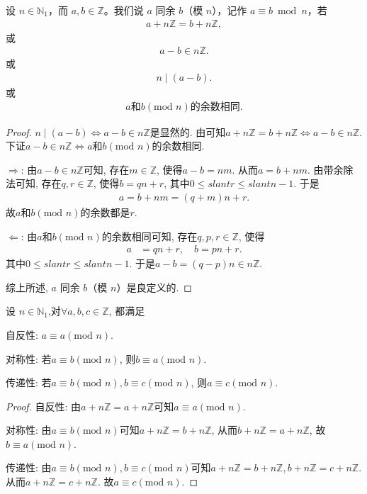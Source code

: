 \documentclass[../../main.tex]{subfiles}
\begin{document}
\begin{definition}[同余(模$n$)]
设 $n\in \mathbb{N}_1$，而 $a,b\in \mathbb{Z}$。我们说 $a$ 同余 $b$（模 $n$），记作 $a\equiv b\bmod n$，若
\begin{align*}
a + n\mathbb{Z}=b + n\mathbb{Z},
\end{align*}
或
\begin{align*}
a - b\in n\mathbb{Z}.
\end{align*}
或
\begin{align*}
n\mid (a-b).
\end{align*}
或
\begin{align*}
    a\text{和}b (\mathrm{mod}\,\,n)\text{的余数相同}.
\end{align*}
\end{definition}
\begin{proof}
$n\mid (a-b)\Leftrightarrow a - b\in n\mathbb{Z}$是显然的.
由可知$a+n\mathbb{Z} =b+n\mathbb{Z} \Leftrightarrow a-b\in n\mathbb{Z} .$下证$a - b \in n\mathbb{Z} \Leftrightarrow a$和$b (\mathrm{mod}\,\,n)$的余数相同.

$\Rightarrow$: 由$a - b \in n\mathbb{Z}$可知, 存在$m \in \mathbb{Z}$, 使得$a - b = nm$. 从而$a = b + nm$. 由带余除法可知, 存在$q, r \in \mathbb{Z}$, 使得$b = qn + r$, 其中$0 \leqslant slant r \leqslant slant n - 1$. 于是
\begin{align*}
a = b + nm 
= (q + m)n + r.
\end{align*}
故$a$和$b (\mathrm{mod}\,\,n)$的余数都是$r$.

$\Leftarrow$: 由$a$和$b (\mathrm{mod}\,\,n)$的余数相同可知, 存在$q, p, r \in \mathbb{Z}$, 使得
\begin{align*}
a &= qn + r, \quad b = pn + r.
\end{align*}
其中$0 \leqslant slant r \leqslant slant n - 1$. 于是$a - b = (q - p)n \in n\mathbb{Z}$.

综上所述, $a$ 同余 $b$（模 $n$）是良定义的.
\end{proof}

\begin{proposition}
设 $n\in \mathbb{N}_1$,对$\forall a, b, c \in \mathbb{Z}$, 都满足

自反性: $a \equiv a (\mathrm{mod}\,\,n)$.

对称性: 若$a \equiv b (\mathrm{mod}\,\,n)$, 则$b \equiv a (\mathrm{mod}\,\,n)$.

传递性: 若$a \equiv b (\mathrm{mod}\,\,n), b \equiv c (\mathrm{mod}\,\,n)$, 则$a \equiv c (\mathrm{mod}\,\,n)$.
\end{proposition}
\begin{proof}
自反性: 由$a + n\mathbb{Z} = a + n\mathbb{Z}$可知$a \equiv a (\mathrm{mod}\,\,n)$.

对称性: 由$a \equiv b (\mathrm{mod}\,\,n)$可知$a + n\mathbb{Z} = b + n\mathbb{Z}$, 从而$b + n\mathbb{Z} = a + n\mathbb{Z}$, 故$b \equiv a (\mathrm{mod}\,\,n)$.

传递性: 由$a \equiv b (\mathrm{mod}\,\,n), b \equiv c (\mathrm{mod}\,\,n)$可知$a + n\mathbb{Z} = b + n\mathbb{Z}, b + n\mathbb{Z} = c + n\mathbb{Z}$. 从而$a + n\mathbb{Z} = c + n\mathbb{Z}$. 故$a \equiv c (\mathrm{mod}\,\,n)$. 
\end{proof}
\end{document}
